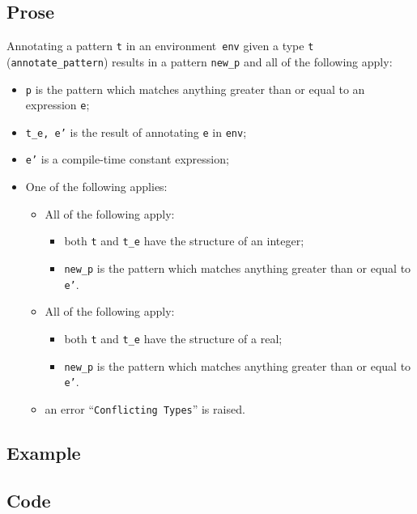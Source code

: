\documentclass{book}
\begin{document}
  \subsection{Prose}
   Annotating a pattern \texttt{t} in an environment~\texttt{env} given a type \texttt{t} (\texttt{annotate\_pattern}) results in a pattern \texttt{new\_p} and all of the following apply:
   \begin{itemize}
   \item \texttt{p} is the pattern which matches anything greater than or equal to an expression \texttt{e};
   \item \texttt{t\_e, e'} is the result of annotating \texttt{e} in \texttt{env}; 
   \item \texttt{e'} is a compile-time constant expression;
   \item One of the following applies:
     \begin{itemize}
     \item All of the following apply:
           \begin{itemize}
           \item both \texttt{t} and \texttt{t\_e} have the structure of an integer;
           \item \texttt{new\_p} is the pattern which matches anything greater than or equal to \texttt{e'}.
           \end{itemize}
     \item All of the following apply:
           \begin{itemize}
           \item both \texttt{t} and \texttt{t\_e} have the structure of a real;
           \item \texttt{new\_p} is the pattern which matches anything greater than or equal to \texttt{e'}.
           \end{itemize} 
     \item an error ``\texttt{Conflicting Types}'' is raised.
     \end{itemize}
   \end{itemize}

  \subsection{Example}

  \subsection{Code}
\end{document}
